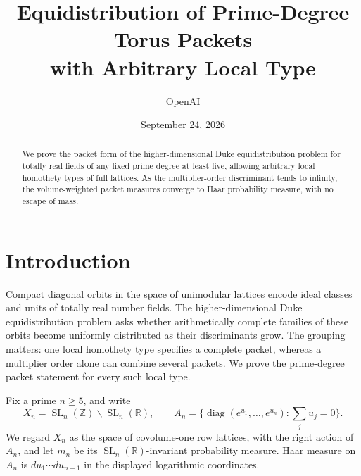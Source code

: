 \documentclass[11pt]{article}
\title{Equidistribution of Prime-Degree Torus Packets\\
with Arbitrary Local Type}
\author{OpenAI}
\date{September 24, 2026}
\theoremstyle{remark}
\newcommand{\R}{\mathbb R}
\newcommand{\Z}{\mathbb Z}
\DeclareMathOperator{\SL}{SL}
\DeclareMathOperator{\diag}{diag}
\numberwithin{equation}{section}
\begin{document}
\maketitle
\begin{abstract}
We prove the packet form of the higher-dimensional Duke equidistribution
problem for totally real fields of any fixed prime degree at least five,
allowing arbitrary local homothety types of full lattices. As the
multiplier-order discriminant tends to infinity, the volume-weighted packet
measures converge to Haar probability measure, with no escape of mass.
\end{abstract}

\section{Introduction}\label{sec:intro}

Compact diagonal orbits in the space of unimodular lattices encode
ideal classes and units of totally real number fields. The higher-dimensional
Duke equidistribution problem asks whether arithmetically complete families
of these orbits become uniformly distributed as their discriminants grow.
The grouping matters: one local homothety type specifies a complete packet,
whereas a multiplier order alone can combine several packets. We prove the
prime-degree packet statement for every such local type.

Fix a prime $n\ge5$, and write
\[
 X_n=\SL_n(\Z)\backslash\SL_n(\R),\qquad
 A_n=\{\diag(e^{u_1},\ldots,e^{u_n}):\textstyle\sum_j u_j=0\}.
\]
We regard $X_n$ as the space of covolume-one row lattices, with the
right action of $A_n$, and let $m_n$ be its $\SL_n(\R)$-invariant
probability measure. Haar measure on $A_n$ is
$du_1\cdots du_{n-1}$ in the displayed logarithmic coordinates.
\end{document}
